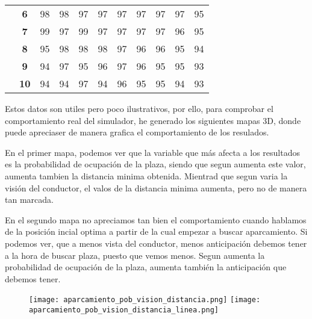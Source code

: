 \begin{table}[h]
{\begin{tabular}{ccrrrrrrrrr}
\multicolumn{1}{c|}{} & \multicolumn{1}{c|}{\textbf{6}} & \multicolumn{1}{r|}{98} & \multicolumn{1}{r|}{98} & \multicolumn{1}{r|}{97} & \multicolumn{1}{r|}{97} & \multicolumn{1}{r|}{97} & \multicolumn{1}{r|}{97} & \multicolumn{1}{r|}{97} & \multicolumn{1}{r|}{97} & \multicolumn{1}{r|}{95} \\ \cline{2-11}
\multicolumn{1}{c|}{} & \multicolumn{1}{c|}{\textbf{7}} & \multicolumn{1}{r|}{99} & \multicolumn{1}{r|}{97} & \multicolumn{1}{r|}{99} & \multicolumn{1}{r|}{97} & \multicolumn{1}{r|}{97} & \multicolumn{1}{r|}{97} & \multicolumn{1}{r|}{97} & \multicolumn{1}{r|}{96} & \multicolumn{1}{r|}{95} \\ \cline{2-11}
\multicolumn{1}{c|}{} & \multicolumn{1}{c|}{\textbf{8}} & \multicolumn{1}{r|}{95} & \multicolumn{1}{r|}{98} & \multicolumn{1}{r|}{98} & \multicolumn{1}{r|}{98} & \multicolumn{1}{r|}{97} & \multicolumn{1}{r|}{96} & \multicolumn{1}{r|}{96} & \multicolumn{1}{r|}{95} & \multicolumn{1}{r|}{94} \\ \cline{2-11}
\multicolumn{1}{c|}{} & \multicolumn{1}{c|}{\textbf{9}} & \multicolumn{1}{r|}{94} & \multicolumn{1}{r|}{97} & \multicolumn{1}{r|}{95} & \multicolumn{1}{r|}{96} & \multicolumn{1}{r|}{97} & \multicolumn{1}{r|}{96} & \multicolumn{1}{r|}{95} & \multicolumn{1}{r|}{95} & \multicolumn{1}{r|}{93} \\ \cline{2-11}
\multicolumn{1}{c|}{} & \multicolumn{1}{c|}{\textbf{10}} & \multicolumn{1}{r|}{94} & \multicolumn{1}{r|}{94} & \multicolumn{1}{r|}{97} & \multicolumn{1}{r|}{94} & \multicolumn{1}{r|}{96} & \multicolumn{1}{r|}{95} & \multicolumn{1}{r|}{95} & \multicolumn{1}{r|}{94} & \multicolumn{1}{r|}{93} \\ \cline{2-11}
\end{tabular}%
}
\end{table}

Estos datos son utiles pero poco ilustrativos, por ello, para comprobar el comportamiento real del simulador, he generado los siguientes mapas 3D, donde puede apreciaser de manera grafica el comportamiento de los resulados.

En el primer mapa, podemos ver que la variable que más afecta a los resultados es la probabilidad de ocupación de la plaza, siendo que segun aumenta este valor, aumenta tambien la distancia minima obtenida. Mientrad que segun varia la visión del conductor, el valos de la distancia minima aumenta, pero no de manera tan marcada.

En el segundo mapa no apreciamos tan bien el comportamiento cuando hablamos de la posición incial optima a partir de la cual empezar a buscar aparcamiento. Si podemos ver, que a menos vista del conductor, menos anticipación debemos tener a la hora de buscar plaza, puesto que vemos menos. Segun aumenta la probabilidad de ocupación de la plaza, aumenta también la anticipación que debemos tener.

\begin{figure}[h]
\texttt{[image: aparcamiento\_pob\_vision\_distancia.png]}
\texttt{[image: aparcamiento\_pob\_vision\_distancia\_linea.png]}
\centering
\end{figure}

